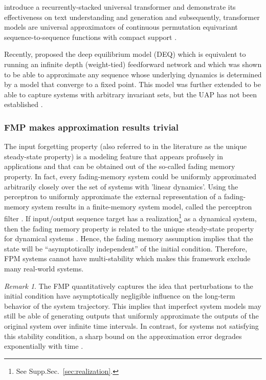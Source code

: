 \documentclass{article}
\theoremstyle{definition}
\theoremstyle{remark}
\newtheorem{remark}{Remark}
\newcounter{ct}
\begin{document}
 \citet{dehghani2018universal} introduce a recurrently-stacked universal transformer and demonstrate its effectiveness on text understanding and generation and subsequently, transformer models are universal approximators of continuous permutation equivariant sequence-to-sequence functions with compact support \citep{yun2019transformers}.


Recently, \citet{bai2019deq} proposed the deep equilibrium model (DEQ) which is equivalent to running an infinite depth (weight-tied) feedforward network and which was shown to be able to approximate any sequence whose underlying dynamics is determined by a model that converge to a fixed point.
This model was further extended to be able to capture systems with arbitrary invariant sets, but the UAP has not been established \citep{konishi2023stable}. %


\subsubsection{FMP makes approximation results trivial} %
 The input forgetting property (also referred to in the literature as the unique steady-state property) is a modeling feature that appears profusely in applications and that can be obtained out of the so-called fading memory property.
In fact, every fading-memory system could be uniformly approximated arbitrarily closely over the set of systems with 'linear dynamics'\citep{matthews1993approximating}. %
Using the perceptron to uniformly approximate the external representation of a fading-memory system results in a finite-memory system model, called the perceptron filter \citep{matthews1993approximating}.
%
If  input/output sequence target has a realization\footnote{See Supp.Sec.~\ref{sec:realization}.} as a dynamical system, then the fading memory property is related to the unique steady-state property for dynamical systems \citep{chua1976qualitative}.
Hence, the fading memory assumption implies that the state will be “asymptotically independent” of the initial condition.
Therefore, FPM systems cannot have multi-stability which makes this framework exclude many real-world systems.

 
\begin{remark}
The FMP quantitatively captures the idea that perturbations to the initial condition have asymptotically negligible influence on the long-term behavior of the system trajectory.
This implies that imperfect system models may still be able of generating outputs that uniformly approximate the outputs of the original system over infinite time intervals.
In contrast, for systems not satisfying this stability condition, a sharp bound on the approximation error degrades exponentially with time \citep{hirsch1974nonautonomous, sontag2013mathematical}.
\end{remark}
\end{document}
